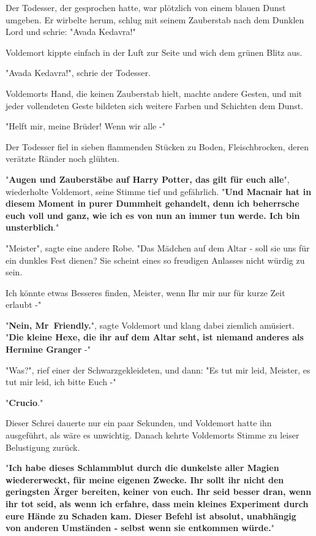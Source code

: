 {Der Todesser, der gesprochen hatte, war plötzlich von einem blauen Dunst umgeben. Er wirbelte herum, schlug mit seinem Zauberstab nach dem Dunklen Lord und schrie: "Avada Kedavra!"

Voldemort kippte einfach in der Luft zur Seite und wich dem grünen Blitz aus.

"Avada Kedavra!", schrie der Todesser.

Voldemorts Hand, die keinen Zauberstab hielt, machte andere Gesten, und mit jeder vollendeten Geste bildeten sich weitere Farben und Schichten dem Dunst.

"Helft mir, meine Brüder! Wenn wir alle -"

Der Todesser fiel in sieben flammenden Stücken zu Boden, Fleischbrocken, deren verätzte Ränder noch glühten.

"\textbf{Augen und Zauberstäbe auf Harry Potter, das gilt für euch alle}", wiederholte Voldemort, seine Stimme tief und gefährlich. "\textbf{Und Macnair hat in diesem Moment in purer Dummheit gehandelt, denn ich beherrsche euch voll und ganz, wie ich es von nun an immer tun werde. Ich bin unsterblich}."

"Meister", sagte eine andere Robe. "Das Mädchen auf dem Altar - soll sie uns für ein dunkles Fest dienen? Sie scheint eines so freudigen Anlasses nicht würdig zu sein.

Ich könnte etwas Besseres finden, Meister, wenn Ihr mir nur für kurze Zeit erlaubt -"

"\textbf{Nein, Mr~Friendly.}", sagte Voldemort und klang dabei ziemlich amüsiert. "\textbf{Die kleine Hexe, die ihr auf dem Altar seht, ist niemand anderes als Hermine Granger} -"

"Was?", rief einer der Schwarzgekleideten, und dann: "Es tut mir leid, Meister, es tut mir leid, ich bitte Euch -"

"\textbf{Crucio}."

Dieser Schrei dauerte nur ein paar Sekunden, und Voldemort hatte ihn ausgeführt, als wäre es unwichtig. Danach kehrte Voldemorts Stimme zu leiser Belustigung zurück.

"\textbf{Ich habe dieses Schlammblut durch die dunkelste aller Magien wiedererweckt, für meine eigenen Zwecke. Ihr sollt ihr nicht den geringsten Ärger bereiten, keiner von euch. Ihr seid besser dran, wenn ihr tot seid, als wenn ich erfahre, dass mein kleines Experiment durch eure Hände zu Schaden kam. Dieser Befehl ist absolut, unabhängig von anderen Umständen - selbst wenn sie entkommen würde.}"

}
